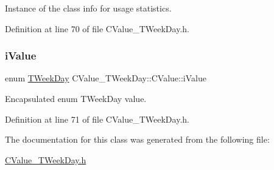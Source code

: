 Instance of the class info for usage statistics. 



Definition at line 70 of file C\+Value\+\_\+\+T\+Week\+Day.\+h.

\mbox{\label{class_c_value___t_week_day_1_1_c_value_ad067d6e43b0204dc09f1177721891a75}} 
\subsubsection{\texorpdfstring{i\+Value}{iValue}}
{\footnotesize\ttfamily enum \hyperlink{namespace_c_value___t_week_day_a6412f204509f223b789fb5f1a61a6124}{T\+Week\+Day} C\+Value\+\_\+\+T\+Week\+Day\+::\+C\+Value\+::i\+Value\hspace{0.3cm}{\ttfamily [private]}}



Encapsulated {\ttfamily enum} T\+Week\+Day value. 



Definition at line 71 of file C\+Value\+\_\+\+T\+Week\+Day.\+h.



The documentation for this class was generated from the following file\+:\begin{DoxyCompactItemize}
\item 
\hyperlink{_c_value___t_week_day_8h}{C\+Value\+\_\+\+T\+Week\+Day.\+h}\end{DoxyCompactItemize}
